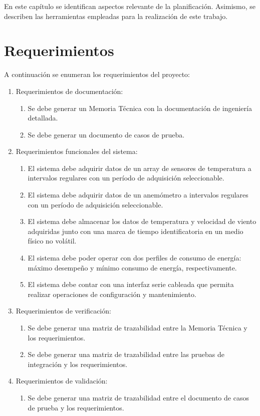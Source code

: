 En este capítulo se identifican aspectos relevante de la planificación. Asimismo, se describen las herramientas empleadas para la realización de este trabajo.

\section{Requerimientos}
\label{sec:requerimientos}

A continuación se enumeran los requerimientos del proyecto:

\begin{enumerate}
  \item Requerimientos de documentación:
   \begin{enumerate}
     \item Se debe generar un Memoria Técnica con la documentación de ingeniería detallada.
	   \item Se debe generar un documento de casos de prueba.
	 \end{enumerate}
	\item Requerimientos funcionales del sistema:
	\begin{enumerate}
		\item El sistema debe adquirir datos de un array de sensores de temperatura a intervalos regulares con un período de adquisición seleccionable.
		\item El sistema debe adquirir datos de un anemómetro a intervalos regulares con un período de adquisición seleccionable.
		\item El sistema debe almacenar los datos de temperatura y velocidad de viento adquiridas junto con una marca de tiempo identificatoria en un medio físico no volátil.
		\item El sistema debe poder operar con dos perfiles de consumo de energía: máximo desempeño y mínimo consumo de energía, respectivamente.
		\item El sistema debe contar con una interfaz serie cableada que permita realizar operaciones de configuración y mantenimiento.
	\end{enumerate}
	\item Requerimientos de verificación:
	\begin{enumerate}
		\item Se debe generar una matriz de trazabilidad entre la Memoria Técnica y los requerimientos.
		\item Se debe generar una matriz de trazabilidad entre las pruebas de integración y los requerimientos.
	\end{enumerate}
	\item Requerimientos de validación:
	\begin{enumerate}
	  \item Se debe generar una matriz de trazabilidad entre el documento de casos de prueba y los requerimientos.
  \end{enumerate}
\end{enumerate}

